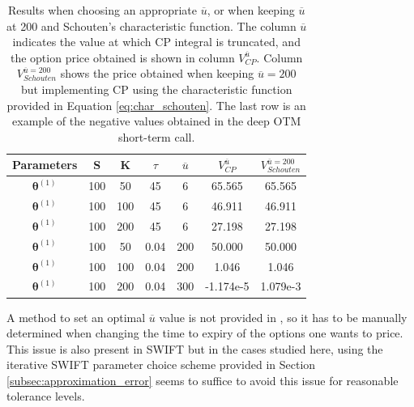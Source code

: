 \documentclass[12,twoside]{mammeTFM}
\theoremstyle{definition}
\theoremstyle{remark}
\begin{document}
\begin{table}[!h]
\begin{center}
 \begin{tabular}{|c | c | c | c | c | c | c |} 
 \hline
 Parameters & S & K & $\tau$ & $\overline{u}$ & $V_{CP}^{\overline{u}}$ & $V_{Schouten}^{\overline{u} = 200}$ \\ [0.5ex] 
 \hline
 $\boldsymbol{\theta}^{(1)}$ & 100 & 50  & 45  & 6 & 65.565 & 65.565 \\ 
 \hline
 $\boldsymbol{\theta}^{(1)}$ & 100 & 100 & 45   & 6 & 46.911 & 46.911 \\ 
 \hline
 $\boldsymbol{\theta}^{(1)}$ & 100 & 200 & 45   & 6 & 27.198 & 27.198 \\ 
 \hline
 $\boldsymbol{\theta}^{(1)}$ & 100 & 50  & 0.04 & 200 & 50.000 & 50.000 \\ 
 \hline
 $\boldsymbol{\theta}^{(1)}$ & 100 & 100 & 0.04 & 200 & 1.046 & 1.046 \\ 
 \hline
 $\boldsymbol{\theta}^{(1)}$ & 100 & 200 & 0.04 & 300 & -1.174e-5 & 1.079e-3 \\
 \hline
\end{tabular}
\end{center}
\caption{Results when choosing an appropriate $\overline{u}$, or when keeping $\overline{u}$ at 200 and Schouten's characteristic function. The column $\overline{u}$ indicates the value at which CP integral is truncated, and the option price obtained is shown in column $V_{CP}^{\overline{u}}$. Column $V_{Schouten}^{\overline{u} = 200}$ shows the price obtained when keeping $\overline{u} = 200$ but implementing CP using the characteristic function provided in Equation \ref{eq:char_schouten}. The last row is an example of the negative values obtained in the deep OTM short-term call.}\label{table:second_attempt}
\end{table}

A method to set an optimal $\overline{u}$ value is not provided in \cite{cui17}, so it has to be manually determined when changing the time to expiry of the options one wants to price. This issue is also present in SWIFT but in the cases studied here, using the iterative SWIFT parameter choice scheme provided in Section \ref{subsec:approximation_error} seems to suffice to avoid this issue for reasonable tolerance levels.
\end{document}
